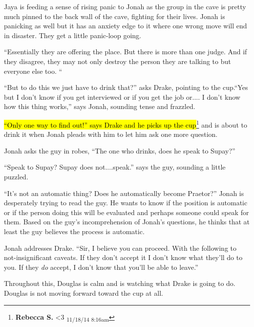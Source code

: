 Jaya is feeding a sense of rising panic to Jonah as the group in the cave is pretty much pinned to the back wall of the cave, fighting for their lives.  Jonah is panicking as well but it has an anxiety edge to it where one wrong move will end in disaster.  They get a little panic-loop going.



``Essentially they are offering the place. But there is more than one judge.  And if they disagree, they may not only destroy the person they are talking to but everyone else too. ``

``But to do this we just have to drink that?'' asks Drake, pointing to the cup.``Yes but I don't know if you get interviewed or if you get the job or.... I don't know how this thing works,'' says Jonah, sounding tense and frazzled.

\hl{``Only one way to find out!'' says Drake and he picks up the cup}\footnote{\textbf{Rebecca S. }\textless 3 \textsubscript{11/18/14 8:16am}} and is about to drink it when Jonah pleads with him to let him ask one more question.

Jonah asks the guy in robes, ``The one who drinks, does he speak to Supay?''

``Speak to Supay?  Supay does not....speak.'' says the guy, sounding a little puzzled.

``It's not an automatic thing?  Does he automatically become Praetor?''  Jonah is desperately trying to read the guy.  He wants to know if the position is automatic or if the person doing this will be evaluated and perhaps someone could speak for them.  Based on the guy's incomprehension of Jonah's questions, he thinks that at least the guy believes the process is automatic.

Jonah addresses Drake.  ``Sir, I believe you can proceed.  With the following to not-insignificant caveats.  If they don't accept it I don't know what they'll do to you.  If they \textit{do} accept, I don't know that you'll be able to leave.''

Throughout this, Douglas is calm and is watching what Drake is going to do.  Douglas is not moving forward toward the cup at all.



